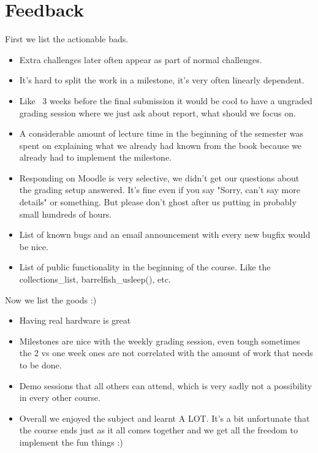 \documentclass[10pt,a4paper,titlepage]{report}
\begin{document}
	\chapter{Feedback}
	First we list the actionable bads.
	\begin{itemize}
        \item  Extra challenges later often appear as part of normal challenges.
        \item  It's hard to split the work in a milestone, it's very often linearly dependent.
        \item  Like ~3 weeks before the final submission it would be cool to have a ungraded grading session where we just ask about report, what should we focus on.
        \item  A considerable amount of lecture time in the beginning of the semester was spent on explaining what we already had known from the book because we already had to implement the milestone.
        \item  Responding on Moodle is very selective, we didn't get our questions about the grading setup answered. It's fine even if you say "Sorry, can't say more details" or something. But please don't ghost after us putting in probably small hundreds of hours.
        \item  List of known bugs and an email announcement with every new bugfix would be nice.
        \item  List of public functionality in the beginning of the course. Like the collections\_list, barrelfish\_usleep(), etc.
    \end{itemize}
    

    Now we list the goods :)
	\begin{itemize}
	    \item Having real hardware is great
	    \item Milestones are nice with the weekly grading session, even tough sometimes the 2 vs one week ones are not correlated with the amount of work that needs to be done.
        \item  Demo sessions that all others can attend, which is very sadly not a possibility in every other course.
        \item Overall we enjoyed the subject and learnt A LOT. It's a bit unfortunate that the course ends just as it all comes together and we get all the freedom to implement the fun things :)
    \end{itemize}
\end{document}
